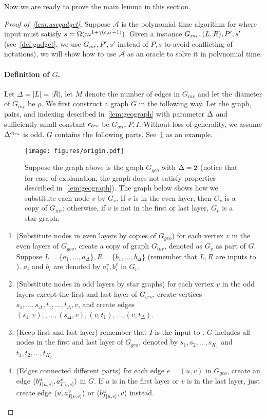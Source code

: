Now we are ready to prove the main lemma in this section.
\begin{proof}[Proof of~\cref{lem:usegadget}]
	Suppose $\mathcal{A}$ is the polynomial time algorithm for  where input must satisfy $s=\Omega(m^{1+\gamma(c_M{}-1)})$. Given a \gadget{\cs{}}{\epsilon} instance $G_{inr},(L,R),P',{s'}$ (see~\cref{def:gadget}, we use $G_{inr},P',s'$ instead of $P,s$ to avoid conflicting of notations), we will show how to use $\mathcal{A}$ as an oracle to solve it in polynomial time.
	
	\paragraph{Definition of $G$.} Let $\Delta=|L|=|R|$, let $M$ denote the number of edges in $G_{inr}$ and let the diameter of $G_{inr}$ be $\rho{}$. We first construct a graph $G$ in the following way. Let the graph, pairs, and indexing described in~\cref{lem:geograph} with parameter $\Delta$ and sufficiently small constant ${c_{lrs}}$ be $G_{geo},P,I$. Without loss of generality, we assume $\Delta^{c_{lrs}}$ is odd. 
	$G$ contains the following parts. See~\cref{fig:origin} as an example.
	
	\begin{figure}
		\centering
		\texttt{[image: figures/origin.pdf]}
		\caption{Suppose the graph above is the graph $G_{geo}$ with $\Delta=2$ (notice that for ease of explanation, the graph does not satisfy properties described in~\cref{lem:geograph}). The graph below shows how we substitute each node $v$ by $G_v$. If $v$ is in the even layer, then $G_v$ is a copy of $G_{inr}$; otherwise, if $v$ is not in the first or last layer, $G_v$ is a star graph. }\label{fig:origin}	
	\end{figure}
	
	\begin{enumerate}
		\item (Substitute nodes in even layers by copies of $G_{geo}$) for each vertex $v$ in the even layers of $G_{geo}$, create a copy of graph $G_{inr}$, denoted as $G_v$ as part of $G$. Suppose $L=\{a_1,...,a_{\Delta}\},R=\{b_1,...,b_\Delta\}$ (remember that $L,R$ are inputs to \gadget{\cs{}}{\epsilon}). $a_i$ and $b_i$ are denoted by $a^v_i,b^v_i$ in $G_v$. 
		\item (Substitute nodes in odd layers by star graphs) for each vertex $v$ in the odd layers except the first and last layer of $G_{geo}$, create vertices $s_1,...,s_{\Delta},t_1,...,t_\Delta,v$, and create edges $(s_1,v),,...,(s_\Delta,v),(v,t_1),...,(v,t_\Delta)$.
		\item (Keep first and last layer) remember that $I$ is the input to \gadget{\cs{}}{\epsilon}. $G$ includes all nodes in the first and last layer of $G_{geo}$, denoted by $s_1,s_2,...,s_{K_1}$ and $t_1,t_2,...,t_{K_2}$.
		\item (Edges connected different parts) for each edge $e=(u,v)$ in $G_{geo}$, create an edge $(b^u_{I{}[u,e]},a^v_{I{}[v,e]})$ in $G$. If $u$ is in the first layer or $v$ is in the last layer, just create edge $(u,a^v_{I{}[v,e]})$ or $(b^u_{I{}[u,e]},v)$ instead.
	\end{enumerate}
	

\end{proof}
